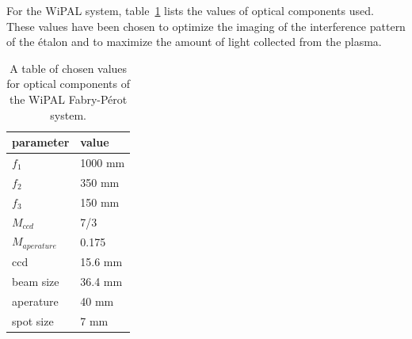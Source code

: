 \documentclass{article}
\begin{document}
For the WiPAL system, table~\ref{tab:system} lists the values of optical components used. These values have been chosen to optimize the imaging of the interference pattern of the \'{e}talon and to maximize the amount of light collected from the plasma. 
\begin{table}
\begin{center}
\begin{tabular}{l | l }
parameter & value \\\hline
$f_{1}$ & 1000 mm\\
$f_{2}$ & 350 mm\\
$f_{3}$ & 150 mm\\
$M_{ccd}$ & 7/3 \\
$M_{aperature}$ & 0.175\\
ccd & 15.6 mm\\
beam size & 36.4 mm\\
aperature & 40 mm\\
spot size & 7 mm
\end{tabular}
\caption{A table of chosen values for optical components of the WiPAL Fabry-P\'{e}rot system.}
\label{tab:system}
\end{center}
\end{table}


%

%

\end{document}

